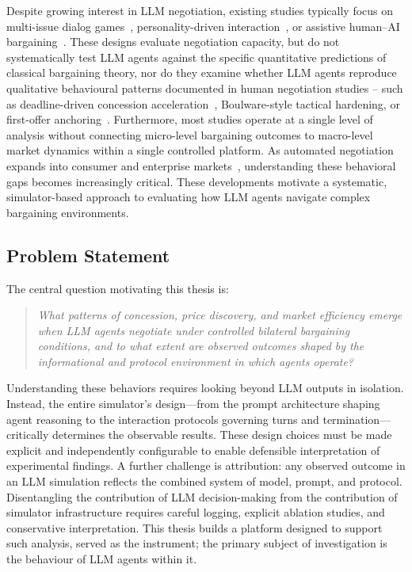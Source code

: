 Despite growing interest in LLM negotiation, existing studies typically
focus on multi-issue dialog games~\cite{lewis2017dealornodeal,
abdelnabi2024llmdeliberation}, personality-driven
interaction~\cite{mao2024personalities}, or assistive human--AI
bargaining~\cite{chawla2023assistive}.  These designs evaluate negotiation
capacity, but do not systematically test LLM agents against the specific
quantitative predictions of classical bargaining theory, nor do they
examine whether LLM agents reproduce qualitative behavioural patterns
documented in human negotiation studies -- such as deadline-driven
concession acceleration~\cite{roth1988deadline}, Boulware-style
tactical hardening, or first-offer anchoring~\cite{galinsky2001}.
Furthermore, most studies operate at a single level of analysis without
connecting micro-level bargaining outcomes to macro-level market dynamics
within a single controlled platform. As automated negotiation expands into consumer and enterprise markets~\cite{davidson2024automatedrisky}, understanding these behavioral gaps becomes increasingly critical. These developments motivate a systematic, simulator-based approach to evaluating how LLM agents navigate complex bargaining environments.

\subsection{Problem Statement}

The central question motivating this thesis is:

\begin{quote}
\textit{What patterns of concession, price discovery, and market efficiency
emerge when LLM agents negotiate under controlled bilateral bargaining
conditions, and to what extent are observed outcomes shaped by the
informational and protocol environment in which agents operate?}
\end{quote}

Understanding these behaviors requires looking beyond LLM outputs in isolation. Instead, the entire simulator's design—from the prompt architecture shaping agent reasoning to the interaction protocols governing turns and termination—critically determines the observable results. These design choices must be made explicit and independently
configurable to enable defensible interpretation of experimental findings.
A further challenge is attribution: any observed outcome in an LLM
simulation reflects the combined system of model, prompt, and protocol.
Disentangling the contribution of LLM decision-making from the contribution
of simulator infrastructure requires careful logging, explicit ablation
studies, and conservative interpretation.  This thesis builds a platform
designed to support such analysis, served as the instrument; the primary subject of investigation is the behaviour of
LLM agents within it.

